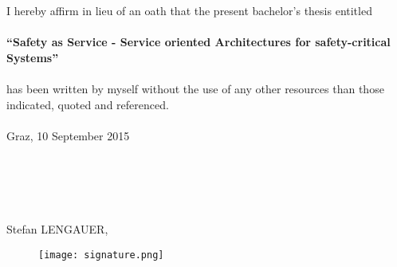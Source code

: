 
I hereby affirm in lieu of an oath that the present bachelor's thesis entitled\\
\\
\textbf{``Safety as Service - Service oriented Architectures for safety-critical Systems''}\\
\\
has been written by myself without the use of any other resources than those indicated, quoted and referenced.\\
\\
Graz, 10 September 2015\\
\\
\\
\\
\\
\\
Stefan LENGAUER,
\begin{figure}[ht]
\texttt{[image: signature.png]}
\end{figure}
